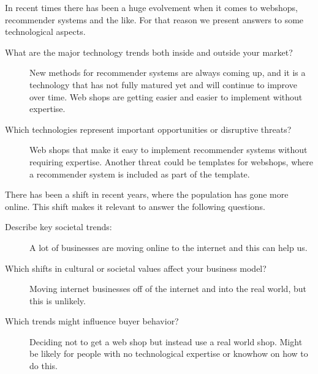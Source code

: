 In recent times there has been a huge evolvement when it comes to webshops, recommender systems and the like. For that reason we present answers to some technological aspects.
\begin{description}
	\item[What are the major technology trends both inside and outside your market?] New methods for recommender systems are always coming up, and it is a technology that has not fully matured yet and will continue to improve over time. Web shops are getting easier and easier to implement without expertise.
	\item[Which technologies represent important opportunities or disruptive threats?] Web shops that make it easy to implement recommender systems without requiring expertise. Another threat could be templates for webshops, where a recommender system is included as part of the template. 
\end{description}

There has been a shift in recent years, where the population has gone more online.
This shift makes it relevant to answer the following questions.
\begin{description}
	\item[Describe key societal trends:] A lot of businesses are moving online to the internet and this can help us.
	\item[Which shifts in cultural or societal values affect your business model?] Moving internet businesses off of the internet and into the real world, but this is unlikely.
	\item[Which trends might influence buyer behavior?] Deciding not to get a web shop but instead use a real world shop. Might be likely for people with no technological expertise or knowhow on how to do this.
\end{description}